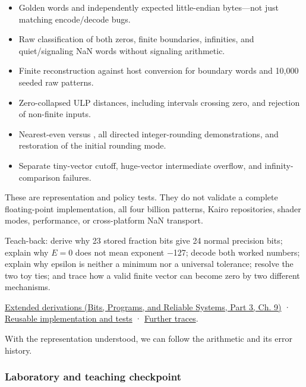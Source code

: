 \begin{itemize}
\tightlist
\item
  Golden words and independently expected little-endian bytes---not just matching encode/decode bugs.
\item
  Raw classification of both zeros, finite boundaries, infinities, and quiet/signaling NaN words without signaling arithmetic.
\item
  Finite reconstruction against host conversion for boundary words and 10,000 seeded raw patterns.
\item
  Zero-collapsed ULP distances, including intervals crossing zero, and rejection of non-finite inputs.
\item
  Nearest-even versus , all directed integer-rounding demonstrations, and restoration of the initial rounding mode.
\item
  Separate tiny-vector cutoff, huge-vector intermediate overflow, and infinity-comparison failures.
\end{itemize}

These are representation and policy tests. They do not validate a complete floating-point implementation, all four billion patterns, Kairo repositories, shader modes, performance, or cross-platform NaN transport.

Teach-back: derive why 23 stored fraction bits give 24 normal precision bits; explain why \(E=0\) does not mean exponent −127; decode both worked numbers; explain why epsilon is neither a minimum nor a universal tolerance; resolve the two toy ties; and trace how a valid finite vector can become zero by two different mechanisms.

\href{../01-Bits-Programs-and-Reliable-Systems-P03/main.pdf\#01-foundations-i-ch011-m004---floating-point-fields-spacing-and-rounding}{Extended derivations (Bits, Programs, and Reliable Systems, Part 3, Ch. 9)} · \hyperref[appendix-4e2236f53445-m004---binary-interchange-inspection-and-strict-rounding-laboratory]{Reusable implementation and tests} · \hyperref[appendix-92ff77d4dfdc-m004---from-fields-to-values-and-failure-paths]{Further traces}.

With the representation understood, we can follow the arithmetic and its error history.

\subsubsection{Laboratory and teaching checkpoint}\label{01-foundations-i-ch001-laboratory-and-teaching-checkpoint}

